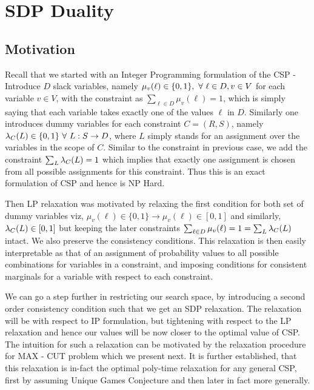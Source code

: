 %
%
%
%

\section{SDP Duality}

%
%

\subsection{Motivation}

Recall that we started with an Integer Programming formulation of the CSP - Introduce $D$ slack variables, namely $\mu_v(\ell) \in \{ 0, 1 \}, \ \forall \  \ell \in D, v \in V $ for each variable $v \in V$, with the constraint as $\sum_{\ell  \in D} \mu_v(\ell) = 1$, which is simply saying that each variable takes exactly one of the values $\ell$ in $D$. 
Similarly one introduces dummy variables for each constraint $C=(R,S)$, namely $\lambda_C(L) \in \{ 0, 1\} \ \forall \  L : S \rightarrow D$, where $L$ simply stands for an assignment over the variables in the scope of $C$. 
Similar to the constraint in previous case, we add the constraint $\sum_L \lambda_C(L) = 1$ which implies that exactly one assignment is chosen from all possible assignments for this constraint.  
Thus this is an exact formulation of CSP and hence is NP Hard. 

Then LP relaxation was motivated by relaxing the first condition for both set of dummy variables viz, $\mu_v(\ell) \in \{ 0, 1\} \rightarrow \mu_v(\ell) \in [0, 1]$ and similarly, $\lambda_C(L) \in [0, 1]$ but keeping the later constraints $\sum_{\ell  \in D} \mu_v(\ell) = 1 = \sum_L \lambda_C(L)$ intact. 
We also preserve the consistency conditions. 
This relaxation is then easily interpretable as that of an assignment of probability values to all possible combinations for variables in a constraint, and imposing conditions for consistent marginals for a variable with respect to each constraint. 

We can go a step further in restricting our search space, by introducing a second order consistency condition such that we get an SDP relaxation. 
The relaxation will be with respect to IP formulation, but tightening with respect to the LP relaxation and hence our values will be now closer to the optimal value of CSP. 
The intuition for such a relaxation can be motivated by the relaxation procedure for MAX - CUT problem which we present next. 
It is further established, that this relaxation is in-fact the optimal poly-time relaxation for any general CSP, first by assuming Unique Games Conjecture and then later in fact more generally. 

